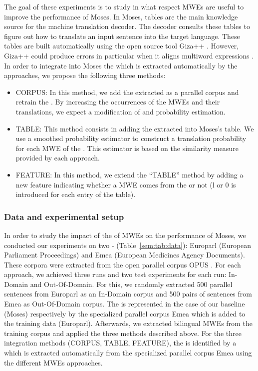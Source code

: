 \documentclass[output=paper,modfonts,nonflat]{langsci/langscibook}
\begin{document}
The goal of these experiments is to study in what respect MWEs are useful to improve the performance of Moses. In Moses,  tables are the main knowledge source for the machine translation decoder. The decoder consults these tables to figure out how to translate an input sentence into the target language. These tables are built automatically using the open source  tool Giza++ \citep{och2000improved}. However, Giza++ could produce errors in particular when it aligns multiword expressions \citep{fraser2007measuring}. In order to integrate into Moses the  which is extracted automatically by the  approaches, we propose the following three methods:
\begin{itemize}
\item CORPUS: In this method, we add the extracted  as a parallel corpus and retrain the . By increasing the occurrences of the MWEs and their translations, we expect a modification of  and probability estimation.
 \item TABLE: This method consists in adding the extracted  into Moses’s  table. We use a smoothed probability estimator to construct a translation probability for each MWE of the . This estimator is based on the similarity measure provided by each  approach.
 \item FEATURE: In this method, we extend the ``TABLE'' method by adding a new feature indicating whether a MWE comes from the  or not (l or 0 is introduced for each entry of the  table).
\end{itemize}



\subsubsection{Data and experimental setup}
In order to study the impact of the  of MWEs on the performance of Moses, we conducted our experiments on two -  (Table~\ref{sem:tab:data}): Europarl (European Parliament Proceedings) and Emea (European Medicines Agency Documents). These corpora were extracted from the open parallel corpus OPUS \citep{tiedemann2012parallel}. For each  approach, we achieved three runs and two test experiments for each run: In-Domain and Out-Of-Domain. For this, we randomly extracted 500 parallel sentences from Europarl as an In-Domain corpus and 500 pairs of sentences from Emea as Out-Of-Domain corpus. The  is represented in the case of our baseline (Moses) respectively by the specialized parallel corpus Emea which is added to the training data (Europarl). Afterwards, we extracted bilingual MWEs from the training corpus and applied the three methods described above. For the three integration methods (CORPUS, TABLE, FEATURE), the  is identified by a  which is extracted automatically from the specialized parallel corpus Emea using the different MWEs  approaches.
\end{document}
